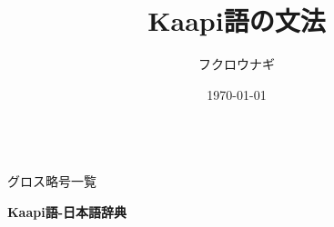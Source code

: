 \documentclass[uplatex, a4paper]{jsarticle}
\title{\textbf{Kaapi語の文法}}
\author{
    フクロウナギ
    }
\date{\today}
\begin{document}
\maketitle
\newpage

\tableofcontents
　\\
グロス略号一覧\\
\printglossaries
\newpage


\newpage

\pagestyle{empty}
\begin{center}
    \vspace*{\fill}
    \Huge \textbf{Kaapi語-日本語辞典}
    \vspace*{\fill}
\end{center}
\newpage

\pagestyle{plain} 

\end{document}
